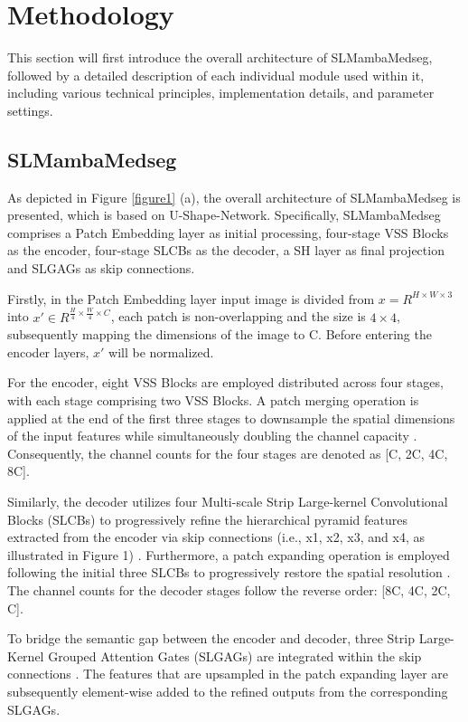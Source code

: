 \documentclass[letterpaper, 10 pt, conference]{ieeeconf}  %
\begin{document}
\section{Methodology}

This section will first introduce the overall architecture of SLMambaMedseg, followed by a detailed description of each individual module used within it, including various technical principles, implementation details, and parameter settings.

\subsection{SLMambaMedseg}

As depicted in Figure \textcolor{red}{\ref{figure1}} (a), the overall architecture of SLMambaMedseg is presented, which is based on U-Shape-Network\cite{ronneberger2015unet}. Specifically, SLMambaMedseg comprises a Patch Embedding layer as initial processing, four-stage VSS Blocks\cite{liu2024vmamba,gu2023mamba} as the encoder, four-stage SLCBs as the decoder, a SH layer as final projection and SLGAGs as skip connections.

Firstly, in the Patch Embedding layer input image is divided from 
$x=R^{H\times W\times 3} $
into
${x}{'}\in {R}^{\frac{H}{4} \times \frac{W}{4} \times C}$, each patch is non-overlapping and the size is $4 \times 4$, subsequently mapping the dimensions of the image to C. Before entering the encoder layers, ${x}{'}$ will be normalized.

For the encoder, eight VSS Blocks are employed distributed across four stages, with each stage comprising two VSS Blocks. A patch merging operation is applied at the end of the first three stages to downsample the spatial dimensions of the input features while simultaneously doubling the channel capacity \cite{liu2021swin}. Consequently, the channel counts for the four stages are denoted as [C, 2C, 4C, 8C].

Similarly, the decoder utilizes four Multi-scale Strip Large-kernel Convolutional Blocks (SLCBs) to progressively refine the hierarchical pyramid features extracted from the encoder via skip connections (i.e., x1, x2, x3, and x4, as illustrated in Figure 1) \cite{lin2017feature}. Furthermore, a patch expanding operation is employed following the initial three SLCBs to progressively restore the spatial resolution \cite{cao2021swinunet}. The channel counts for the decoder stages follow the reverse order: [8C, 4C, 2C, C].

To bridge the semantic gap between the encoder and decoder, three Strip Large-Kernel Grouped Attention Gates (SLGAGs) are integrated within the skip connections \cite{oktay2018attention}. The features that are upsampled in the patch expanding layer are subsequently element-wise added to the refined outputs from the corresponding SLGAGs.
\end{document}
